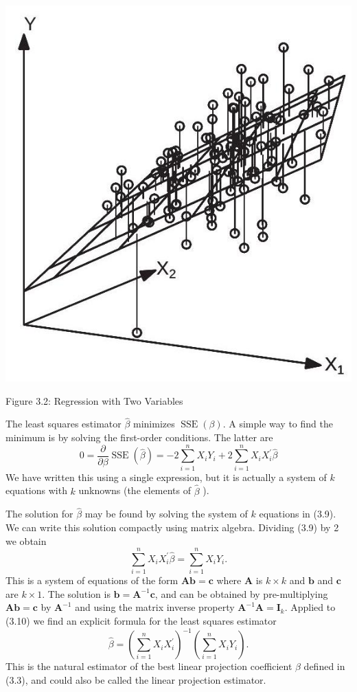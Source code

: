 \documentclass[10pt]{article}
\begin{document}
\includegraphics[max width=\textwidth]{2022_09_17_333a3ece3fb3afcc15d0g-06}

Figure 3.2: Regression with Two Variables

The least squares estimator $\widehat{\beta}$ minimizes $\operatorname{SSE}(\beta)$. A simple way to find the minimum is by solving the first-order conditions. The latter are
$$
0=\frac{\partial}{\partial \beta} \operatorname{SSE}(\widehat{\beta})=-2 \sum_{i=1}^{n} X_{i} Y_{i}+2 \sum_{i=1}^{n} X_{i} X_{i}^{\prime} \widehat{\beta}
$$
We have written this using a single expression, but it is actually a system of $k$ equations with $k$ unknowns (the elements of $\widehat{\beta}$ ).

The solution for $\widehat{\beta}$ may be found by solving the system of $k$ equations in (3.9). We can write this solution compactly using matrix algebra. Dividing (3.9) by 2 we obtain
$$
\sum_{i=1}^{n} X_{i} X_{i}^{\prime} \widehat{\beta}=\sum_{i=1}^{n} X_{i} Y_{i} .
$$
This is a system of equations of the form $\boldsymbol{A} \boldsymbol{b}=\boldsymbol{c}$ where $\boldsymbol{A}$ is $k \times k$ and $\boldsymbol{b}$ and $\boldsymbol{c}$ are $k \times 1$. The solution is $\boldsymbol{b}=\boldsymbol{A}^{-1} \boldsymbol{c}$, and can be obtained by pre-multiplying $\boldsymbol{A} \boldsymbol{b}=\boldsymbol{c}$ by $\boldsymbol{A}^{-1}$ and using the matrix inverse property $\boldsymbol{A}^{-1} \boldsymbol{A}=\boldsymbol{I}_{k}$. Applied to (3.10) we find an explicit formula for the least squares estimator
$$
\widehat{\beta}=\left(\sum_{i=1}^{n} X_{i} X_{i}^{\prime}\right)^{-1}\left(\sum_{i=1}^{n} X_{i} Y_{i}\right) .
$$
This is the natural estimator of the best linear projection coefficient $\beta$ defined in (3.3), and could also be called the linear projection estimator.
\end{document}

